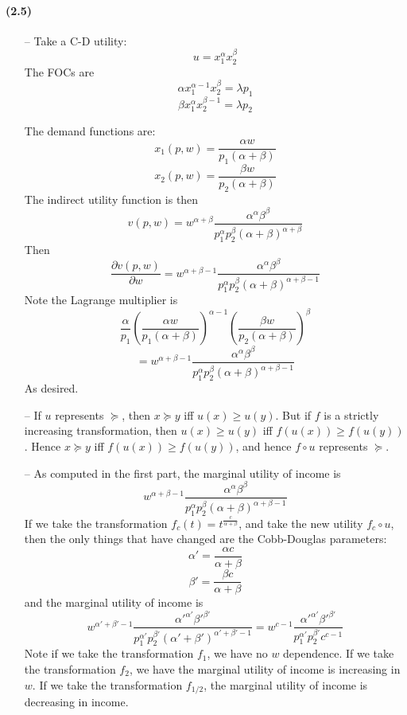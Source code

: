 \documentclass[10pt,letter]{article}
\begin{document}
\paragraph{(2.5)}
\begin{itemize}
\item[--] Take a C-D utility:
\[ u = x_1^\alpha x_2^{\beta} \]
The FOCs are
\[ \alpha x_1^{\alpha-1} x_2^{\beta} = \lambda p_1 \]
\[ \beta x_1^{\alpha} x_2^{\beta - 1} = \lambda p_2 \]

The demand functions are:
\[ x_1(p,w) = \frac{\alpha w}{p_1(\alpha + \beta)} \]
\[ x_2(p,w) = \frac{\beta w}{p_2(\alpha + \beta)} \]
The indirect utility function is then
\[ v(p,w) = w^{\alpha + \beta}\frac{\alpha^\alpha\beta^\beta }{p_1^\alpha p_2^{\beta} (\alpha + \beta)^{\alpha + \beta}}\]
Then
\[ \frac{\partial v(p,w)}{\partial w} = w^{\alpha + \beta - 1}\frac{\alpha^\alpha\beta^\beta }{p_1^\alpha p_2^{\beta}(\alpha + \beta)^{\alpha + \beta - 1}} \]
Note the Lagrange multiplier is
\[\frac{\alpha}{p_1} \left(\frac{\alpha w}{p_1(\alpha + \beta)}\right)^{\alpha-1}\left( \frac{\beta w}{p_2(\alpha + \beta)} \right)^{\beta}  \]
\[ = w^{\alpha + \beta - 1}\frac{\alpha^\alpha\beta^\beta }{p_1^\alpha p_2^{\beta} (\alpha + \beta)^{\alpha + \beta - 1}}  \]
As desired.
\item[--]
If $u$ represents $\succeq$, then $x \succeq y$ iff $u(x) \ge u(y)$. But if $f$ is a strictly increasing transformation, then $u(x) \ge u(y)$ iff $f(u(x)) \ge f(u(y))$. Hence $x \succeq y$ iff $f(u(x)) \ge f(u(y))$, and hence $f \circ u$ represents $\succeq$.
\item[--]
As computed in the first part, the marginal utility of income is
\[ w^{\alpha + \beta - 1}\frac{\alpha^\alpha\beta^\beta }{p_1^\alpha p_2^{\beta} (\alpha + \beta)^{\alpha + \beta - 1}} \]
If we take the transformation $f_c(t) = t^{\frac{c}{\alpha + \beta}}$, and take the new utility $f_c \circ u$, then the only things that have changed are the Cobb-Douglas parameters:
\[ \alpha' = \frac{\alpha c}{\alpha + \beta} \]
\[ \beta' = \frac{\beta c}{\alpha + \beta} \]
and the marginal utility of income is
\[ w^{\alpha' + \beta' - 1}\frac{\alpha'^{\alpha'}\beta'^{\beta'} }{p_1^{\alpha'} p_2^{\beta'} (\alpha' + \beta')^{\alpha' + \beta' - 1}}  = w^{c-1} \frac{\alpha'^{\alpha'}\beta'^{\beta'} }{p_1^{\alpha'} p_2^{\beta'} c^{c-1}}\]
Note if we take the transformation $f_1$, we have no $w$ dependence. If we take the transformation $f_2$, we have the marginal utility of income is increasing in $w$. If we take the transformation $f_{1/2}$, the marginal utility of income is decreasing in income.

\end{itemize}
\end{document}
